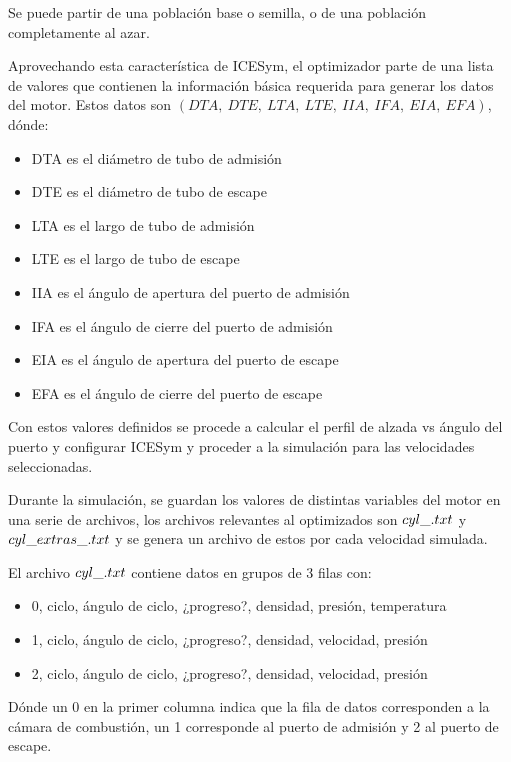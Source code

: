 Se puede partir de una población base o semilla, o de una población
completamente al azar.

Aprovechando esta característica de ICESym, el optimizador parte de una lista
de valores que contienen la información básica requerida para generar los datos
del motor.
%
Estos datos son \emph{$(DTA,\ DTE,\ LTA,\ LTE,\ IIA,\ IFA,\ EIA,\ EFA)$},
dónde:
%
\begin{itemize}
    \item DTA es el diámetro de tubo de admisión
    \item DTE es el diámetro de tubo de escape
    \item LTA es el largo de tubo de admisión
    \item LTE es el largo de tubo de escape
    \item IIA es el ángulo de apertura del puerto de admisión
    \item IFA es el ángulo de cierre del puerto de admisión
    \item EIA es el ángulo de apertura del puerto de escape
    \item EFA es el ángulo de cierre del puerto de escape
\end{itemize}
%

Con estos valores definidos se procede a calcular el perfil de alzada vs ángulo
del puerto y configurar ICESym y proceder a la simulación para las velocidades
seleccionadas.

Durante la simulación, se guardan los valores de distintas variables del motor
en una serie de archivos, los archivos relevantes al optimizados son
\emph{$cyl\_\*.txt$} y \emph{$cyl\_extras\_\*.txt$} y se genera un archivo de
estos por cada velocidad simulada.


El archivo \emph{$cyl\_\*.txt$} contiene datos en grupos de 3 filas con:

\begin{itemize}
        \item 0, ciclo, ángulo de ciclo, ¿progreso?, densidad, presión, temperatura
        \item 1, ciclo, ángulo de ciclo, ¿progreso?, densidad, velocidad, presión
        \item 2, ciclo, ángulo de ciclo, ¿progreso?, densidad, velocidad, presión
\end{itemize}

Dónde un 0 en la primer columna indica que la fila de datos corresponden a la
cámara de combustión, un 1 corresponde al puerto de admisión y 2 al puerto de
escape.

